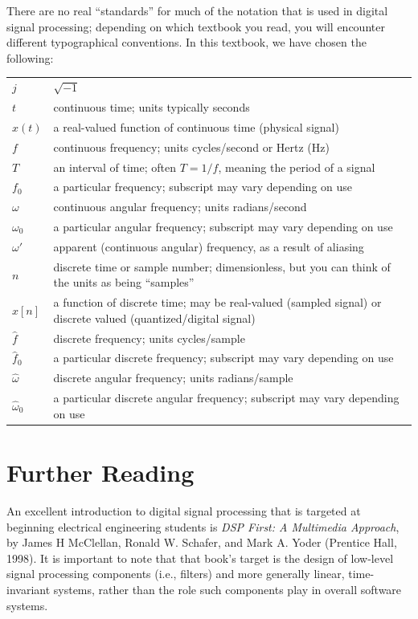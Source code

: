 There are no real ``standards'' for much of the notation that is used
in digital signal processing; depending on which textbook you read,
you will encounter different typographical conventions. In this
textbook, we have chosen the following:
\begin{center}
\begin{tabular}{lp{5in}}
  $j$    & $\sqrt{-1}$ \\
  $t$    & continuous time; units typically seconds \\
  $x(t)$ & a real-valued function of continuous time (physical signal) \\
  $f$    & continuous frequency; units cycles/second or Hertz (Hz) \\
  $T$    & an interval of time; often $T=1/f$, meaning the period of a
           signal \\
  $f_0$  & a particular frequency; subscript may vary depending on use \\
  $\omega$ & continuous angular frequency; units radians/second \\
  $\omega_0$ & a particular angular frequency; subscript may vary
               depending on use \\
  $\omega'$ & apparent (continuous angular) frequency, as a result of
                        aliasing \\
  $n$    & discrete time or sample number; dimensionless, but you can
           think of the units as being ``samples'' \\
  $x[n]$ & a function of discrete time; may be real-valued (sampled
           signal) or discrete valued (quantized/digital signal) \\
  $\hat{f}$ & discrete frequency; units cycles/sample \\
  $\hat{f}_0$  & a particular discrete frequency; subscript may vary
                 depending on use \\
  $\hat{\omega}$ & discrete angular frequency; units radians/sample \\
  $\hat{\omega}_0$ & a particular discrete angular frequency; subscript may vary
               depending on use \\
\end{tabular}
\end{center}

\section*{Further Reading}

An excellent introduction to digital signal processing that is
targeted at beginning electrical engineering students is \textit{DSP
  First: A Multimedia Approach}, by James H McClellan, Ronald
W. Schafer, and Mark A. Yoder (Prentice Hall, 1998).  It is important
to note that that book's target is the design of low-level signal
processing components (i.e., filters) and more generally linear,
time-invariant systems, rather than the role such components play in
overall software systems.

